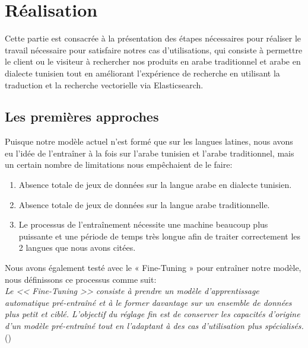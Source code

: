 

\section{Réalisation}
\noindent
Cette partie est consacrée à la présentation des étapes nécessaires pour réaliser le travail nécessaire pour satisfaire notres cas d'utilisations, qui consiste à permettre le client ou le visiteur à rechercher nos produits en arabe traditionnel et arabe en dialecte tunisien tout en améliorant l'expérience de recherche en utilisant la traduction et la recherche vectorielle via Elasticsearch.

\subsection{Les premières approches}
\noindent
Puisque notre modèle actuel n'est formé que sur les langues latines, nous avons eu l'idée de l'entraîner à la fois sur l'arabe tunisien et l'arabe traditionnel, mais un certain nombre de limitations nous empêchaient de le faire:

\begin{enumerate}
	\item Absence totale de jeux de données sur la langue arabe en dialecte tunisien.
	\item Absence totale de jeux de données sur la langue arabe traditionnelle.
	\item Le processus de l'entraînement nécessite une machine beaucoup plus puissante et une période de temps très longue afin de traiter correctement les 2 langues que nous avons citées.
\end{enumerate}

\noindent
Nous avons également testé avec le « Fine-Tuning » pour entraîner notre modèle, nous définissons ce processus comme suit: \\
\textit{Le << Fine-Tuning >> consiste à prendre un modèle d'apprentissage automatique pré-entraîné et à le former davantage sur un ensemble de données plus petit et ciblé. L'objectif du réglage fin est de conserver les capacités d'origine d'un modèle pré-entraîné tout en l'adaptant à des cas d'utilisation plus spécialisés.} \\  (\cite{techtarget:finetuning})

